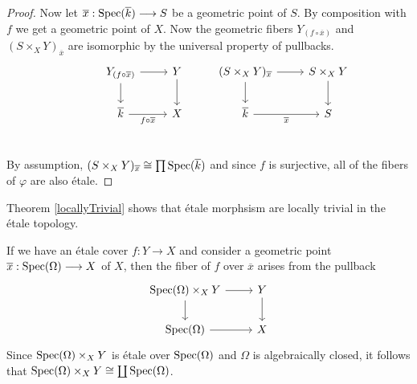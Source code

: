 \begin{proof}
  Now let $\overline{x} : \operatorname{Spec}(\overline{k}) \longrightarrow S$ be a geometric point of $S$. By composition with $f$ we get a geometric point of $X$. Now the geometric fibers $Y_{(f \circ \overline{x})}$ and $(S \times_X Y)_{\overline{x}}$  are isomorphic by the universal property of pullbacks. 
  \[
\begin{tikzcd}
	& {Y_{(f \circ \overline{x})}} & Y & {(S \times_X Y)_{\overline{x}}} & {S \times_X Y} \\
	& {\overline{k}} & X & {\overline{k}} & S \\
	{}
	\arrow[from=1-3, to=2-3]
	\arrow[from=1-2, to=1-3]
	\arrow["{f \circ \overline{x}}"', from=2-2, to=2-3]
	\arrow[from=1-2, to=2-2]
	\arrow[from=1-4, to=2-4]
	\arrow[from=1-4, to=1-5]
	\arrow[from=1-5, to=2-5]
	\arrow["{\overline{x}}"', from=2-4, to=2-5]
\end{tikzcd}
\]
By assumption, $(S\times_X Y)_{\overline{x}} \cong \prod \operatorname{Spec}(\overline{k})$ and since $f$ is surjective, all of the fibers of $\varphi$ are also \'etale.
\end{proof}
Theorem \ref{locallyTrivial} shows that \'etale morphsism are locally trivial in the \'etale topology.

\begin{remark}
  If we have an \'etale cover $f: Y \to X$ and consider a geometric point $\overline{x} : \operatorname{Spec}(\Omega) \longrightarrow X$ of $X$, then the fiber of $f$ over $\overline{x}$ arises from the pullback
    \[\begin{tikzcd}
    	{\Spec(\Omega)\times_X Y} & Y \\
    	{\Spec(\Omega)} & X
    	\arrow[from=1-1, to=2-1]
    	\arrow[from=1-1, to=1-2]
    	\arrow[from=1-2, to=2-2]
    	\arrow[from=2-1, to=2-2]
    \end{tikzcd}\]
  Since $\operatorname{Spec}(\Omega)\times_X Y$ is \'etale over $\operatorname{Spec}(\Omega)$ and $\Omega$ is algebraically closed, it follows that $\operatorname{Spec}(\Omega)\times_X Y \cong \coprod \operatorname{Spec}(\Omega)$.
\end{remark}

